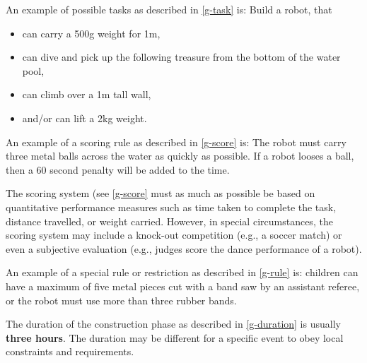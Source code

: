\documentclass[12pt]{hurocup}
\begin{document}
\begin{decisions}

\item An example of possible tasks as described in \ref{g-task} is:
  Build a robot, that
  \begin{itemize}
    \item can carry a 500g weight for 1m,
    \item can dive and pick up the following treasure from the bottom
      of the water pool,
    \item can climb over a 1m tall wall,
    \item and/or can lift a 2kg weight.
  \end{itemize}
\item An example of a scoring rule as described in \ref{g-score} is:
  The robot must carry three metal balls across the water as quickly
  as possible. If a robot looses a ball, then a 60 second penalty will
  be added to the time.

\item The scoring system (see \ref{g-score} must as much as possible
  be based on quantitative performance measures such as time taken to
  complete the task, distance travelled, or weight carried. However,
  in special circumstances, the scoring system may include a knock-out
  competition (e.g., a soccer match) or even a subjective evaluation
  (e.g., judges score the dance performance of a robot).

\item An example of a special rule or restriction as described in
  \ref{g-rule} is: children can have a maximum of five metal pieces
  cut with a band saw by an assistant referee, or the robot must use
  more than three rubber bands.

\item The duration of the construction phase as described in
  \ref{g-duration} is usually \textbf{three hours}. The duration may
  be different for a specific event to obey local constraints and
  requirements.

\end{decisions}

\end{document}
